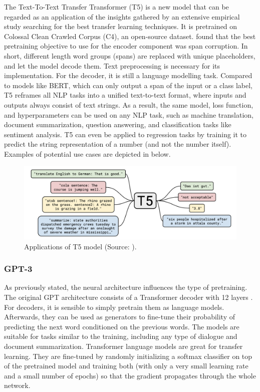 \documentclass[
]{krantz}
\begin{document}
The Text-To-Text Transfer Transformer (T5) is a new model that can be
regarded as an application of the insights gathered by an extensive
empirical study searching for the best transfer learning techniques. It
is pretrained on Colossal Clean Crawled Corpus (C4), an open-source
dataset. \citet{Raffel2019} found that the best pretraining objective to use
for the encoder component was span corruption. In short, different
length word groups (spans) are replaced with unique placeholders, and
let the model decode them. Text preprocessing is necessary for its
implementation. For the decoder, it is still a language modelling task.
Compared to models like BERT, which can only output a span of the input
or a class label, T5 reframes all NLP tasks into a unified text-to-text
format, where inputs and outputs always consist of text strings. As a
result, the same model, loss function, and hyperparameters can be used
on any NLP task, such as machine translation, document summarization,
question answering, and classification tasks like sentiment analysis. T5
can even be applied to regression tasks by training it to predict the
string representation of a number (and not the number itself). Examples
of potential use cases are depicted in below.

\begin{figure}

{\centering \includegraphics[width=0.8\linewidth]{./figures/01-01-nlp/t5_stanford} 

}

\caption{Applications of T5 model (Source: \citet{Raffel2019}).}\label{fig:t5}
\end{figure}



\hypertarget{gpt-3}{%
\subsubsection{GPT-3}\label{gpt-3}}

As previously stated, the neural architecture influences the type of
pretraining. The original GPT architecture consists of a Transformer
decoder with 12 layers \citep{Radford2018}. For decoders, it is
sensible to simply pretrain them as language models. Afterwards, they
can be used as generators to fine-tune their probability of predicting
the next word conditioned on the previous words. The models are suitable
for tasks similar to the training, including any type of dialogue and
document summarization. Transformer language models are great for
transfer learning. They are fine-tuned by randomly initializing a
softmax classifier on top of the pretrained model and training both
(with only a very small learning rate and a small number of epochs) so
that the gradient propagates through the whole network.\\
\end{document}
